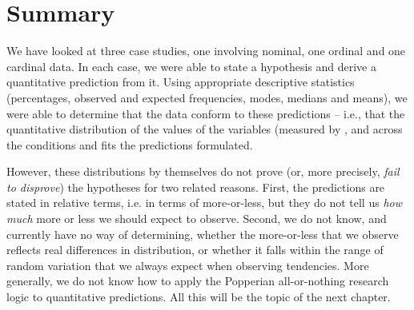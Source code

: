 \section{Summary}
\label{sec:datatypessummary}

We have looked at three case studies, one involving nominal,  one ordinal  and one cardinal  data. In each case, we were able to state a hypothesis  and derive a quantitative  prediction from it. Using appropriate descriptive  statistics  (percentages, observed and expected  frequencies, modes,  medians  and means),  we were able to determine that the data conform to these predictions -- i.e., that the quantitative distribution  of the values of the variables   (measured  by ,  and   across the conditions   and  fits the predictions formulated.

However, these distributions  by themselves do not prove (or, more precisely, \textit{fail to disprove}) the hypotheses  for two related reasons. First, the predictions are stated in relative terms, i.e. in terms of more\hyp{}or\hyp{}less, but they do not tell us \textit{how much} more or less we should expect to observe. Second, we do not know, and currently have no way of determining, whether the more\hyp{}or\hyp{}less that we observe reflects real differences in distribution,  or whether it falls within the range of random  variation  that we always expect when observing tendencies. More generally, we do not know how to apply the Popperian all\hyp{}or\hyp{}nothing research logic to quantitative  predictions. All this will be the topic of the next chapter.